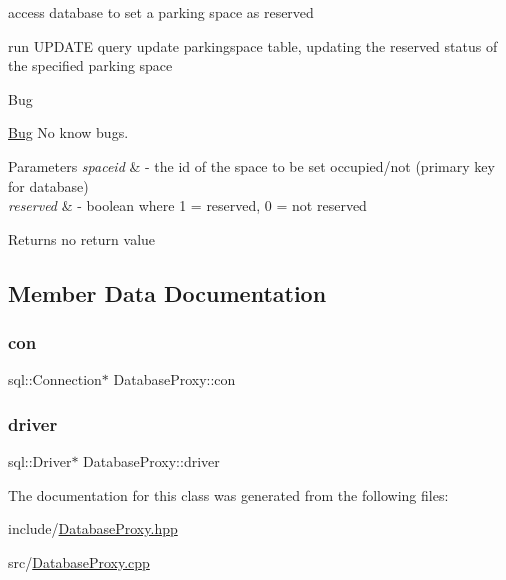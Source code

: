 access database to set a parking space as reserved 

run U\+P\+D\+A\+TE query update parkingspace table, updating the reserved status of the specified parking space

\begin{DoxyRefDesc}{Bug}
\item[\mbox{\hyperlink{bug__bug000016}{Bug}}]No know bugs. \end{DoxyRefDesc}

\begin{DoxyParams}{Parameters}
{\em spaceid} & -\/ the id of the space to be set occupied/not (primary key for database) \\
\hline
{\em reserved} & -\/ boolean where 1 = reserved, 0 = not reserved \\
\hline
\end{DoxyParams}
\begin{DoxyReturn}{Returns}
no return value 
\end{DoxyReturn}


\subsection{Member Data Documentation}
\mbox{\label{class_database_proxy_acb075c3ad08b6da866b931c39c8e8285}} 
\subsubsection{\texorpdfstring{con}{con}}
{\footnotesize\ttfamily sql\+::\+Connection$\ast$ Database\+Proxy\+::con\hspace{0.3cm}{\ttfamily [private]}}

\mbox{\label{class_database_proxy_ac939a4eb877368773792ef0f79538faf}} 
\subsubsection{\texorpdfstring{driver}{driver}}
{\footnotesize\ttfamily sql\+::\+Driver$\ast$ Database\+Proxy\+::driver\hspace{0.3cm}{\ttfamily [private]}}



The documentation for this class was generated from the following files\+:\begin{DoxyCompactItemize}
\item 
include/\mbox{\hyperlink{_database_proxy_8hpp}{Database\+Proxy.\+hpp}}\item 
src/\mbox{\hyperlink{_database_proxy_8cpp}{Database\+Proxy.\+cpp}}\end{DoxyCompactItemize}
